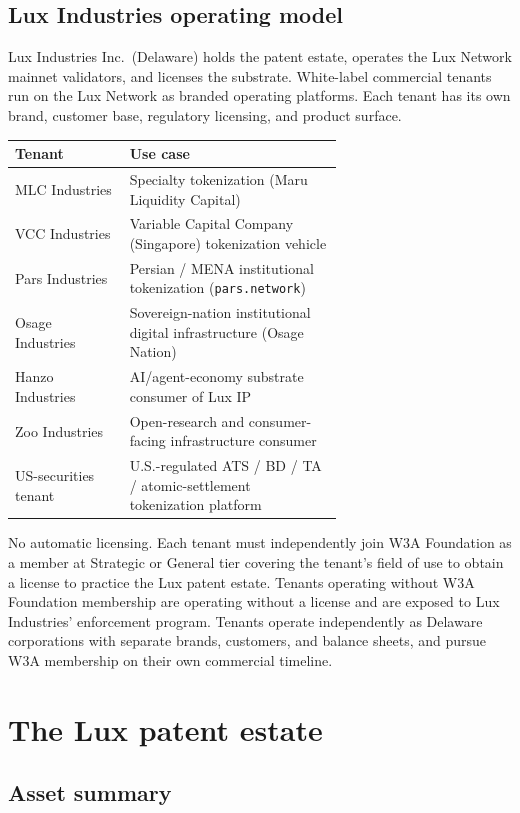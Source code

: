 \documentclass[11pt,letterpaper]{article}
\begin{document}
\subsection{Lux Industries operating model}

Lux Industries Inc.\ (Delaware) holds the patent estate, operates the Lux Network mainnet validators, and licenses the substrate. White-label commercial tenants run on the Lux Network as branded operating platforms. Each tenant has its own brand, customer base, regulatory licensing, and product surface.

\begin{longtable}{lp{0.65\linewidth}}
\toprule
\textbf{Tenant} & \textbf{Use case} \\
\midrule
MLC Industries & Specialty tokenization (Maru Liquidity Capital) \\
VCC Industries & Variable Capital Company (Singapore) tokenization vehicle \\
Pars Industries & Persian / MENA institutional tokenization (\texttt{pars.network}) \\
Osage Industries & Sovereign-nation institutional digital infrastructure (Osage Nation) \\
Hanzo Industries & AI/agent-economy substrate consumer of Lux IP \\
Zoo Industries & Open-research and consumer-facing infrastructure consumer \\
US-securities tenant & U.S.-regulated ATS / BD / TA / atomic-settlement tokenization platform \\
\bottomrule
\end{longtable}

No automatic licensing. Each tenant must independently join W3A Foundation as a member at Strategic or General tier covering the tenant's field of use to obtain a license to practice the Lux patent estate. Tenants operating without W3A Foundation membership are operating without a license and are exposed to Lux Industries' enforcement program. Tenants operate independently as Delaware corporations with separate brands, customers, and balance sheets, and pursue W3A membership on their own commercial timeline.

\section{The Lux patent estate}

\subsection{Asset summary}
\end{document}
